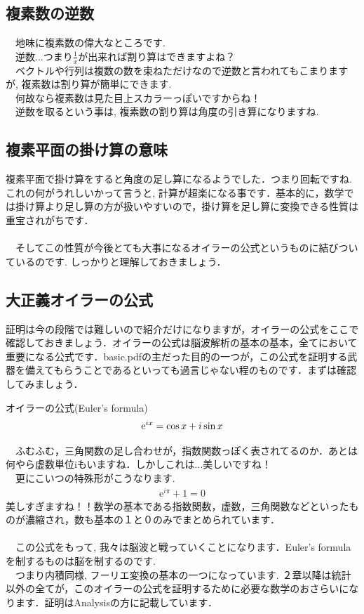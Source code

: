 \documentclass[11pt,a4paper]{jreport}
\begin{document}
\subsection{複素数の逆数}
　地味に複素数の偉大なところです.\\
　逆数...つまり$\frac{1}{x}$が出来れば割り算はできますよね？\\
　ベクトルや行列は複数の数を束ねただけなので逆数と言われてもこまりますが, 複素数は割り算が簡単にできます. \\
　何故なら複素数は見た目上スカラーっぽいですからね！\\
　逆数を取るという事は, 複素数の割り算は角度の引き算になりますね.\\

\subsection{複素平面の掛け算の意味}
複素平面で掛け算をすると角度の足し算になるようでした．つまり回転ですね. これの何がうれしいかって言うと, 計算が超楽になる事です．基本的に，数学では掛け算より足し算の方が扱いやすいので，掛け算を足し算に変換できる性質は重宝されがちです．\\
\\
　そしてこの性質が今後とても大事になるオイラーの公式というものに結びついているのです. しっかりと理解しておきましょう．
\subsection{大正義オイラーの公式}
証明は今の段階では難しいので紹介だけになりますが，オイラーの公式をここで確認しておきましょう．オイラーの公式は脳波解析の基本の基本，全てにおいて重要になる公式です．basic.pdfの主だった目的の一つが，この公式を証明する武器を備えてもらうことであるといっても過言じゃない程のものです．まずは確認してみましょう．

\begin{screen}
オイラーの公式(Euler's formula)
\begin{eqnarray}
\mathrm{e}^{ix} = \cos x + \mathstrut i\sin x
\label{eq:euler}
\end{eqnarray}
\end{screen}

　ふむふむ，三角関数の足し合わせが，指数関数っぽく表されてるのか．あとは何やら虚数単位iもいますね．しかしこれは...美しいですね！\\
　更にこいつの特殊形がこうなります.\\
\begin{eqnarray}
\mathrm{e}^{i\pi} + 1 = 0
\end{eqnarray}
美しすぎますね！！数学の基本である指数関数，虚数，三角関数などといったものが濃縮され，数も基本の１と０のみでまとめられています．\\
\\
　この公式をもって, 我々は脳波と戦っていくことになります．Euler's formula を制するものは脳を制するのです.\\
　つまり内積同様, フーリエ変換の基本の一つになっています. ２章以降は統計以外の全てが，このオイラーの公式を証明するために必要な数学のおさらいになります．証明はAnalysisの方に記載しています．
\end{document}
